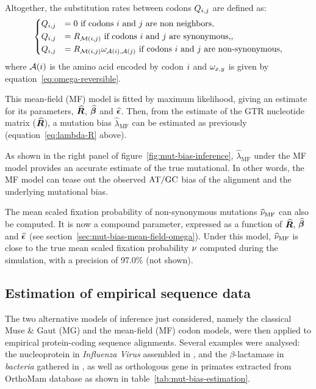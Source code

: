 \documentclass{article}
\begin{document}
Altogether, the {substitution} rates between codons $Q_{{i}, {j}}$ are defined as:
\begin{equation}
    \begin{dcases}
        Q_{{i}, {j}} & = 0 \text{ if codons ${i}$ and ${j}$ are non neighbors}, \\
        Q_{{i}, {j}} & = R_{\mathcal{M}({i}, {j})} \text{ if codons ${i}$ and ${j}$ are {synonymous},}, \\
        Q_{{i}, {j}} & = R_{\mathcal{M}({i}, {j})} \omega_{\mathcal{A}({i}), \mathcal{A}({j})} \text{ if codons ${i}$ and ${j}$ are non-synonymous},
    \end{dcases}
    \label{eq:codon-mean-field}
\end{equation}
where $\mathcal{A}({i})$ is the amino acid encoded by codon ${i}$ and $\omega_{x, y}$ is given by equation~\ref{eq:omega-reversible}.

This mean-field ({MF}) model is fitted by maximum {likelihood}, giving an estimate for its parameters, $\widehat{\bm{R}}$, $\widehat{\bm{\beta}}$ and $\widehat{\bm{\epsilon}}$.
Then, from the estimate of the {GTR} nucleotide matrix ($\widehat{\bm{R}}$), a mutation bias $\widehat{\lambda}_{\text{{MF}}}$ can be estimated as previously (equation~\ref{eq:lambda-R} above).

As shown in the right panel of figure~\ref{fig:mut-bias-inference}, $\widehat{\lambda}_{\text{{MF}}}$ under the {MF} model provides an accurate estimate of the true mutational.
In other words, the {MF} model can tease out the observed $\text{AT/GC}$ bias of the alignment and the underlying mutational bias.

The mean scaled fixation probability of {non-synonymous} mutations $\widehat{\nu}_{\text{{MF}}}$ can also be computed.
It is now a compound parameter, expressed as a function of $\widehat{\bm{R}}$, $\widehat{\bm{\beta}}$ and $\widehat{\bm{\epsilon}}$ (see section~\ref{sec:mut-bias-mean-field-omega}).
Under this model, $\widehat{\nu}_{\text{{MF}}}$ is close to the true mean scaled fixation probability $\nu$ computed during the simulation, with a precision of 97.0\% (not shown).

\subsection{Estimation of empirical sequence data}
\label{subsec:estimation-of-empirical-sequence-data}

The two alternative models of inference just considered, namely the classical Muse \& Gaut ({MG}) and the mean-field ({MF}) codon models, were then applied to empirical protein-coding sequence alignments.
Several examples were analysed: the nucleoprotein in \textit{Influenza Virus} assembled in \citet{Bloom2017}, and the $\beta$-lactamase in \textit{bacteria} gathered in \citet{Bloom2014}, as well as orthologous gene in primates extracted from OrthoMam database as shown in table~\ref{tab:mut-bias-estimation}.
\end{document}
